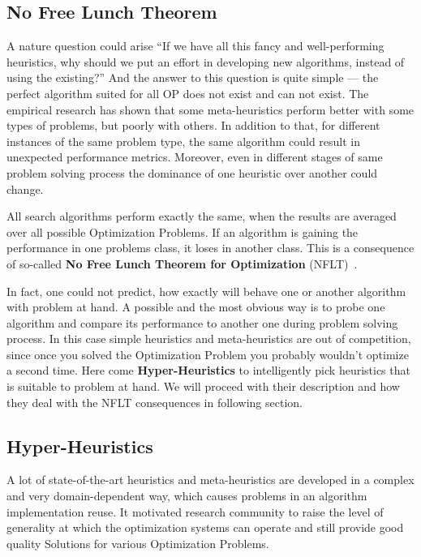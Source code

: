 

\subsection{No Free Lunch Theorem}
A nature question could arise ``If we have all this fancy and well-performing heuristics, why should we put an effort in developing new algorithms, instead of using the existing?'' And the answer to this question is quite simple — the perfect algorithm suited for all OP does not exist and can not exist. 
The empirical research has shown that some meta-heuristics perform better with some types of problems, but poorly with others. In addition to that, for different instances of the same problem type, the same algorithm could result in unexpected performance metrics. Moreover, even in different stages of same problem solving process the dominance of one heuristic over another could change. 

All search algorithms perform exactly the same, when the results are averaged over all possible Optimization Problems. If an algorithm is gaining the performance in one problems class, it loses in another class. This is a consequence of so-called \textbf{No Free Lunch Theorem for Optimization} (NFLT)~\cite{wolpert1997no}.

In fact, one could not predict, how exactly will behave one or another algorithm with problem at hand. A possible and the most obvious way is to probe one algorithm and compare its performance to another one during problem solving process. In this case simple heuristics and meta-heuristics are out of competition, since once you solved the Optimization Problem you probably wouldn't optimize a second time.
Here come \textbf{Hyper-Heuristics} to intelligently pick heuristics that is suitable to problem at hand. We will proceed with their description and how they deal with the NFLT consequences in following section.


\subsection{Hyper-Heuristics}\label{bg: hh}
A lot of state-of-the-art heuristics and meta-heuristics are developed in a complex and very domain-dependent way, which causes problems in an algorithm implementation reuse. It motivated research community to raise the level of generality at which the optimization systems can operate and still provide good quality Solutions for various Optimization Problems. 

